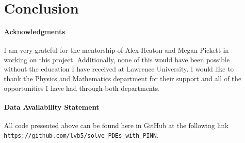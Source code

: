 \documentclass{CUP-JNL-DTM}%
\theoremstyle{definition}
\numberwithin{equation}{section}
\begin{document}

\section{Conclusion}


\begin{Backmatter}

\paragraph{Acknowledgments}

I am very grateful for the mentorship of Alex Heaton and Megan Pickett in working on this project. Additionally, none of this would have been possible without the education I have received at Lawrence University. I would like to thank the Physics and Mathematics department for their support and all of the opportunities I have had through both departments. 

\paragraph{Data Availability Statement} All code presented above can be found here in GitHub at the following link \texttt{https://github.com/lvb5/solve\_PDEs\_with\_PINN}. 




\end{Backmatter}
\end{document}
